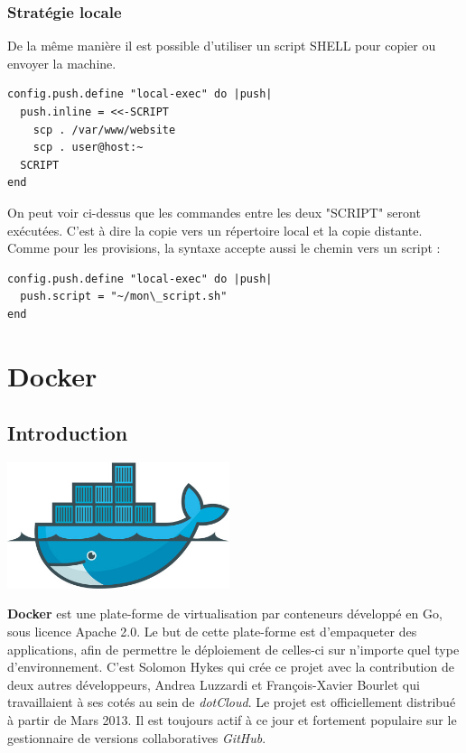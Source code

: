\documentclass[12pt,a4paper]{article}
\begin{document}
\subsubsection{Stratégie locale}
De la même manière il est possible d'utiliser un script SHELL pour copier ou envoyer la machine.
\begin{lstlisting}
config.push.define "local-exec" do |push|
  push.inline = <<-SCRIPT
    scp . /var/www/website
	scp . user@host:~
  SCRIPT
end
\end{lstlisting}
On peut voir ci-dessus que les commandes entre les deux "SCRIPT" seront exécutées. C'est à dire la copie vers un répertoire local et la copie distante. Comme pour les provisions, la syntaxe accepte aussi le chemin vers un script :
\begin{lstlisting}
config.push.define "local-exec" do |push|
  push.script = "~/mon\_script.sh"
end
\end{lstlisting}

\section{Docker}

\subsection{Introduction}
\begin{center}
  \includegraphics[width=6.5cm]{images_rapport/docker_logo.jpg}
\end{center}

\newpage

\textbf{Docker} est une plate-forme de virtualisation par conteneurs développé en Go, sous licence Apache 2.0. Le but de cette plate-forme est d'empaqueter des applications, afin de permettre le déploiement de celles-ci sur n'importe quel type d'environnement. C'est Solomon Hykes qui crée ce projet avec la contribution de deux autres développeurs, Andrea Luzzardi et François-Xavier Bourlet qui travaillaient à ses cotés au sein de \textit{dotCloud}. Le projet est officiellement distribué à partir de Mars 2013. Il est toujours actif à ce jour et fortement populaire sur le gestionnaire de versions collaboratives \textit{GitHub}.
\end{document}
